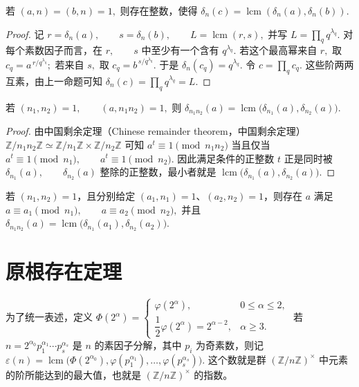 \documentclass[oneside]{AJbook}
\newcommand{\Z}{\mathbb Z}
\newcommand{\U}[1]{(\Z/#1\Z)^\times}
\begin{document}
\begin{theorem}[阶的最小公倍数可以实现]
若
\(
  (a,n)=(b,n)=1,
\)
则存在整数，使得
\(
  \delta_n(c)=\operatorname{lcm}(\delta_n(a),\delta_n(b)).
\)
\end{theorem}

\begin{proof}
记
\(
  r=\delta_n(a),\qquad s=\delta_n(b),\qquad L=\operatorname{lcm}(r,s),
\)
并写
\(
  L=\prod_q q^{\lambda_q}.
\)
对每个素数因子而言，在
\(
  r,\qquad s
\)
中至少有一个含有
\(
  q^{\lambda_q}.
\)
若这个最高幂来自
\(
  r,
\)
取
\(
  c_q=a^{\,r/q^{\lambda_q}};
\)
若来自
\(
  s,
\)
取
\(
  c_q=b^{\,s/q^{\lambda_q}}.
\)
于是
\(
  \delta_n(c_q)=q^{\lambda_q}.
\)
令
\(
  c=\prod_q c_q.
\)
这些阶两两互素，由上一命题可知
\(
  \delta_n(c)=\prod_q q^{\lambda_q}=L.
\)
\end{proof}

\begin{proposition}[中国剩余定理下的阶]
若
\(
  (n_1,n_2)=1,\qquad (a,n_1n_2)=1,
\)
则
\(
  \delta_{n_1n_2}(a)
  =
  \operatorname{lcm}\bigl(\delta_{n_1}(a),\delta_{n_2}(a)\bigr).
\)
\end{proposition}

\begin{proof}
由中国剩余定理（Chinese remainder theorem，中国剩余定理）
\(
  \Z/n_1n_2\Z\simeq \Z/n_1\Z\times \Z/n_2\Z
\)
可知
\(
  a^t\equiv 1\pmod {n_1n_2}
\)
当且仅当
\(
  a^t\equiv 1\pmod {n_1},\qquad
  a^t\equiv 1\pmod {n_2}.
\)
因此满足条件的正整数
\(
  t
\)
正是同时被
\(
  \delta_{n_1}(a),\qquad \delta_{n_2}(a)
\)
整除的正整数，最小者就是
\(
  \operatorname{lcm}\bigl(\delta_{n_1}(a),\delta_{n_2}(a)\bigr).
\)
\end{proof}

\begin{corollary}
若 $(n_1,n_2)=1$，且分别给定 $(a_1,n_1)=1$、$(a_2,n_2)=1$，则存在 $a$ 满足
\(
  a\equiv a_1\pmod {n_1},\qquad
  a\equiv a_2\pmod {n_2},
\)
并且
\(
  \delta_{n_1n_2}(a)
  =
  \operatorname{lcm}\bigl(\delta_{n_1}(a_1),\delta_{n_2}(a_2)\bigr).
\)
\end{corollary}

\section{原根存在定理}

为了统一表述，定义
\(
  \Phi(2^\alpha)=
  \begin{cases}
    \varphi(2^\alpha), & 0\le \alpha\le 2,\\
    \dfrac12\varphi(2^\alpha)=2^{\alpha-2}, & \alpha\ge 3.
  \end{cases}
\)
若
\(
  n=2^{\alpha_0}p_1^{\alpha_1}\cdots p_s^{\alpha_s}
\)
是 $n$ 的素因子分解，其中 $p_i$ 为奇素数，则记
\(
  \varepsilon(n)
  =
  \operatorname{lcm}\bigl(\Phi(2^{\alpha_0}),
  \varphi(p_1^{\alpha_1}),\ldots,\varphi(p_s^{\alpha_s})\bigr).
\)
这个数就是群 $\U n$ 中元素的阶所能达到的最大值，也就是 $\U n$ 的指数。
\end{document}
